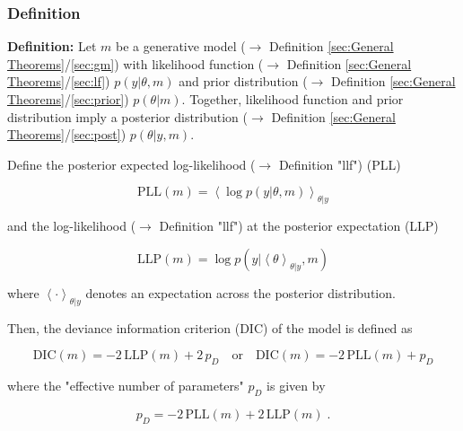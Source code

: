 \documentclass[a4paper,12pt]{book}
\begin{document}
\subsubsection[\textit{Definition}]{Definition} \label{sec:dic}

\vspace{1em}
\textbf{Definition:} Let $m$ be a generative model ($\rightarrow$ Definition \ref{sec:General Theorems}/\ref{sec:gm}) with likelihood function ($\rightarrow$ Definition \ref{sec:General Theorems}/\ref{sec:lf}) $p(y \vert \theta, m)$ and prior distribution ($\rightarrow$ Definition \ref{sec:General Theorems}/\ref{sec:prior}) $p(\theta \vert m)$. Together, likelihood function and prior distribution imply a posterior distribution ($\rightarrow$ Definition \ref{sec:General Theorems}/\ref{sec:post}) $p(\theta \vert y, m)$.

Define the posterior expected log-likelihood ($\rightarrow$ Definition "llf") (PLL)

\begin{equation} \label{eq:dic-PLL}
\mathrm{PLL}(m) = \left\langle \log p(y|\theta,m) \right\rangle_{\theta|y}
\end{equation}

and the log-likelihood ($\rightarrow$ Definition "llf") at the posterior expectation (LLP)

\begin{equation} \label{eq:dic-LLP}
\mathrm{LLP}(m) = \log p(y|\left\langle \theta \right\rangle_{\theta|y},m)
\end{equation}

where $\left\langle \cdot \right\rangle_{\theta \vert y}$ denotes an expectation across the posterior distribution.

Then, the deviance information criterion (DIC) of the model is defined as

\begin{equation} \label{eq:dic-DIC}
\mathrm{DIC}(m) = -2 \, \mathrm{LLP}(m) + 2 \, p_D \quad \text{or} \quad \mathrm{DIC}(m) = -2 \, \mathrm{PLL}(m) + p_D
\end{equation}

where the "effective number of parameters" $p_D$ is given by

\begin{equation} \label{eq:dic-DIC-pD}
p_D = -2 \, \mathrm{PLL}(m) +2 \, \mathrm{LLP}(m) \; .
\end{equation}
\end{document}
